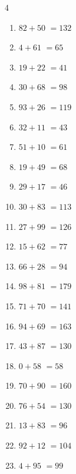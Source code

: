\begin{multicols}{4}
\begin{enumerate}
  \item $82+50$
        $=132$

  \item $4+61$
        $=65$

  \item $19+22$
        $=41$

  \item $30+68$
        $=98$

  \item $93+26$
        $=119$

  \item $32+11$
        $=43$

  \item $51+10$
        $=61$

  \item $19+49$
        $=68$

  \item $29+17$
        $=46$

  \item $30+83$
        $=113$

  \item $27+99$
        $=126$

  \item $15+62$
        $=77$

  \item $66+28$
        $=94$

  \item $98+81$
        $=179$

  \item $71+70$
        $=141$

  \item $94+69$
        $=163$

  \item $43+87$
        $=130$

  \item $0+58$
        $=58$

  \item $70+90$
        $=160$

  \item $76+54$
        $=130$

\columnbreak %

\resetques

  \item $13+83$
        $=96$

  \item $92+12$
        $=104$

  \item $4+95$
        $=99$


\end{enumerate}
\end{multicols}
